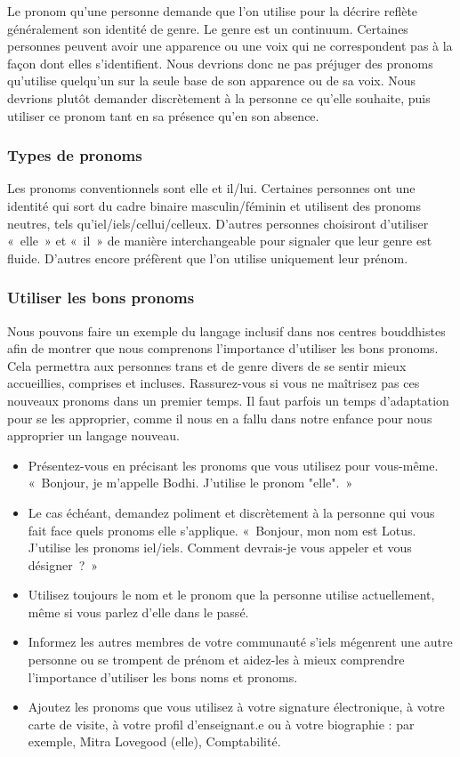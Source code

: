 \documentclass[12pt,openany]{book}
\begin{document}
Le pronom qu’une personne demande que l’on utilise pour la décrire reflète généralement son identité de genre. Le genre est un continuum. Certaines personnes peuvent avoir une apparence ou une voix qui ne correspondent pas à la façon dont elles s’identifient. Nous devrions donc ne pas préjuger des pronoms qu’utilise quelqu’un sur la seule base de son apparence ou de sa voix. Nous devrions plutôt demander discrètement à la personne ce qu’elle souhaite, puis utiliser ce pronom tant en sa présence qu’en son absence.

\subsubsection*{Types de pronoms}

\noindent Les pronoms conventionnels sont elle et il/lui. Certaines personnes ont une identité qui sort du cadre binaire masculin/féminin et utilisent des pronoms neutres, tels qu’iel/iels/cellui/celleux. D’autres personnes choisiront d’utiliser \mbox{« elle »} et \mbox{« il »} de manière interchangeable pour signaler que leur genre est fluide. D’autres encore préfèrent que l’on utilise uniquement leur prénom.

\subsubsection*{Utiliser les bons pronoms}

\noindent Nous pouvons faire un exemple du langage inclusif dans nos centres bouddhistes afin de montrer que nous comprenons l’importance d’utiliser les bons pronoms. Cela permettra aux personnes trans et de genre divers de se sentir mieux accueillies, comprises et incluses.
Rassurez-vous si vous ne maîtrisez pas ces nouveaux pronoms dans un premier temps. Il faut parfois un temps d’adaptation pour se les approprier, comme il nous en a fallu dans notre enfance pour nous approprier un langage nouveau.

\begin{itemize}[label=\textbullet]
\setlength\itemsep{-0.3em}
\item Présentez-vous en précisant les pronoms que vous utilisez pour vous-même.
\mbox{« Bonjour}, je m’appelle Bodhi. J’utilise le pronom \mbox{"elle". »}
\item Le cas échéant, demandez poliment et discrètement à la personne qui vous fait face quels pronoms elle s’applique. \mbox{« Bonjour}, mon nom est Lotus. J’utilise les pronoms iel/iels. Comment devrais-je vous appeler et vous \mbox{désigner ? »}
\item Utilisez toujours le nom et le pronom que la personne utilise actuellement, même si vous parlez d’elle dans le passé.
\item Informez les autres membres de votre communauté s’iels mégenrent une autre personne ou se trompent de prénom et aidez-les à mieux comprendre l’importance d’utiliser les bons noms et pronoms.
\item Ajoutez les pronoms que vous utilisez à votre signature électronique, à votre carte de visite, à votre profil d’enseignant.e ou à votre biographie : par exemple, Mitra Lovegood (elle), Comptabilité.
\end{itemize}
\end{document}
